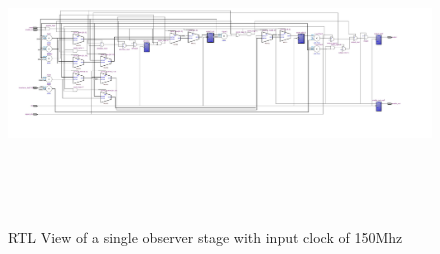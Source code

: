 \begin{figure}[]
\centering
\includegraphics[width=650px,height=300px,angle=-90]{../../pictures/22.02.2014/onlyObserver/OBS_150M.jpg}
\caption[RTL View of Observer 0 with clock 150Mhz]{RTL View of a single observer stage with input clock of 150Mhz}
\label{fig:test:only:150:obs0}
\end{figure}

\newpage
